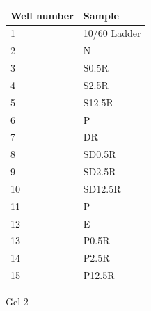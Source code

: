 \documentclass{ssiBio}
\begin{document}
\begin{figure}[ht] %
\begin{center}
\begin{tabular}{|l|l|}
\hline
Well number    & Sample \\ \hline
1                                  & 10/60 Ladder   \\ \hline
2                                  & N   \\ \hline
3                                  & S0.5R \\ \hline
4                                  & S2.5R \\ \hline
5                                  & S12.5R \\ \hline
6                                  & P \\ \hline
7                                  & DR \\ \hline
8                                  & SD0.5R \\ \hline
9								   & SD2.5R \\ \hline
10                                 & SD12.5R \\ \hline
11                                 & P  \\ \hline
12                                 & E  \\ \hline
13								   & P0.5R \\ \hline
14                                 & P2.5R \\ \hline
15								   & P12.5R \\ \hline


\end{tabular}
\label{tab:Gel 2 Layout} %
\caption{Gel 2} %
\end{center}
\end{figure}

\end{document}
